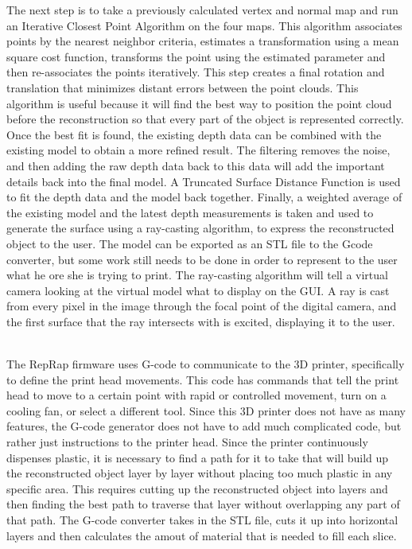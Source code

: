 \documentclass[12pt,twocolumn]{article}
\begin{document}
\indent The next step is to take a previously calculated vertex and normal map and run an Iterative Closest Point Algorithm on the four maps. This algorithm associates points by the nearest neighbor criteria, estimates a transformation using a mean square cost function, transforms the point using the estimated parameter and then re-associates the points iteratively. This step creates a final rotation and translation that minimizes distant errors between the point clouds. This algorithm is useful because it will find the best way to position the point cloud before the reconstruction so that every part of the object is represented correctly. Once the best fit is found, the existing depth data can be combined with the existing model to obtain a more refined result. The filtering removes the noise, and then adding the raw depth data back to this data will add the important details back into the final model. A Truncated Surface Distance Function is used to fit the depth data and the model back together. Finally, a weighted average of the existing model and the latest depth measurements is taken and used to generate the surface using a ray-casting algorithm, to express the reconstructed object to the user. The model can be exported as an STL file to the Gcode converter, but some work still needs to be done in order to represent to the user what he ore she is trying to print. The ray-casting algorithm will tell a virtual camera looking at the virtual model what to display on the GUI. A ray is cast from every pixel in the image through the focal point of the digital camera, and the first surface that the ray intersects with is excited, displaying it to the user.  \cite{cite8}


\\ 
The RepRap firmware uses G-code to communicate to the 3D printer, specifically to define the print head movements. This code has commands that tell the print head to move to a certain point with rapid or controlled movement, turn on a cooling fan, or select a different tool. Since this 3D printer does not have as many features, the G-code generator does not have to add much complicated code, but rather just instructions to the printer head. Since the printer continuously dispenses plastic, it is necessary to find a path for it to take that will build up the reconstructed object layer by layer without placing too much plastic in any specific area. This requires cutting up the reconstructed object into layers and then finding the best path to traverse that layer without overlapping any part of that path. The G-code converter takes in the STL file, cuts it up into horizontal layers and then calculates the amout of material that is needed to fill each slice. 
\end{document}
